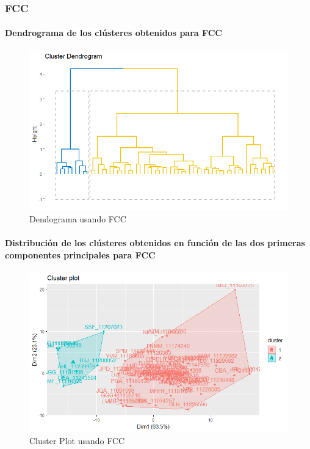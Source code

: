 \subsubsection{FCC}

\paragraph{Dendrograma de los clústeres obtenidos para FCC}

\begin{figure}[H]
    \centering
    \includegraphics[scale = 0.8]{img/06-1-ccf.png}
    \caption{Dendograma usando FCC}
    \label{fig:ccf_den}
\end{figure}

\paragraph{Distribución de los clústeres obtenidos en función de las dos primeras componentes principales para FCC}

\begin{figure}[H]
    \centering
    \includegraphics[scale = 0.8]{img/06-2-ccf.png}
    \caption{Cluster Plot usando FCC}
    \label{fig:ccf_pc}
\end{figure}

